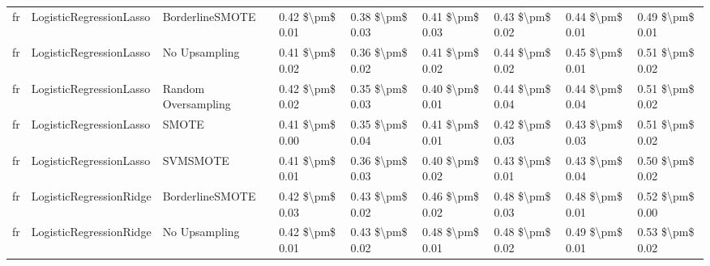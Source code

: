\begin{tabular}{lllllllll}
      fr &         LogisticRegressionLasso &               BorderlineSMOTE & 0.42 \$\textbackslash pm\$ 0.01 &           0.38 \$\textbackslash pm\$ 0.03 &       0.41 \$\textbackslash pm\$ 0.03 &        0.43 \$\textbackslash pm\$ 0.02 &                         0.44 \$\textbackslash pm\$ 0.01 &     0.49 \$\textbackslash pm\$ 0.01 \\
      fr &         LogisticRegressionLasso &                 No Upsampling & 0.41 \$\textbackslash pm\$ 0.02 &           0.36 \$\textbackslash pm\$ 0.02 &       0.41 \$\textbackslash pm\$ 0.02 &        0.44 \$\textbackslash pm\$ 0.02 &                         0.45 \$\textbackslash pm\$ 0.01 &     0.51 \$\textbackslash pm\$ 0.02 \\
      fr &         LogisticRegressionLasso &           Random Oversampling & 0.42 \$\textbackslash pm\$ 0.02 &           0.35 \$\textbackslash pm\$ 0.03 &       0.40 \$\textbackslash pm\$ 0.01 &        0.44 \$\textbackslash pm\$ 0.04 &                         0.44 \$\textbackslash pm\$ 0.04 &     0.51 \$\textbackslash pm\$ 0.02 \\
      fr &         LogisticRegressionLasso &                         SMOTE & 0.41 \$\textbackslash pm\$ 0.00 &           0.35 \$\textbackslash pm\$ 0.04 &       0.41 \$\textbackslash pm\$ 0.01 &        0.42 \$\textbackslash pm\$ 0.03 &                         0.43 \$\textbackslash pm\$ 0.03 &     0.51 \$\textbackslash pm\$ 0.02 \\
      fr &         LogisticRegressionLasso &                      SVMSMOTE & 0.41 \$\textbackslash pm\$ 0.01 &           0.36 \$\textbackslash pm\$ 0.03 &       0.40 \$\textbackslash pm\$ 0.02 &        0.43 \$\textbackslash pm\$ 0.01 &                         0.43 \$\textbackslash pm\$ 0.04 &     0.50 \$\textbackslash pm\$ 0.02 \\
      fr &         LogisticRegressionRidge &               BorderlineSMOTE & 0.42 \$\textbackslash pm\$ 0.03 &           0.43 \$\textbackslash pm\$ 0.02 &       0.46 \$\textbackslash pm\$ 0.02 &        0.48 \$\textbackslash pm\$ 0.03 &                         0.48 \$\textbackslash pm\$ 0.01 &     0.52 \$\textbackslash pm\$ 0.00 \\
      fr &         LogisticRegressionRidge &                 No Upsampling & 0.42 \$\textbackslash pm\$ 0.01 &           0.43 \$\textbackslash pm\$ 0.02 &       0.48 \$\textbackslash pm\$ 0.01 &        0.48 \$\textbackslash pm\$ 0.02 &                         0.49 \$\textbackslash pm\$ 0.01 &     0.53 \$\textbackslash pm\$ 0.02 \\

\end{tabular}
